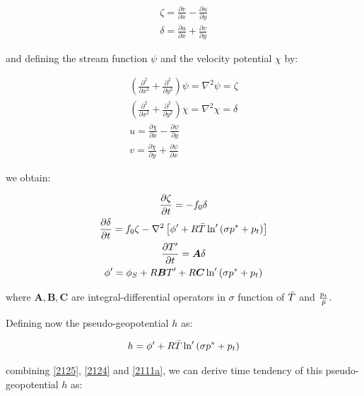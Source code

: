 \begin{gather}
  \label{vorticity}
  \zeta = \frac{\partial v}{\partial x} -
          \frac{\partial u}{\partial y} \\
  \label{divergence}
        \delta = \frac{\partial u}{\partial x} +
                 \frac{\partial v}{\partial y}
\end{gather}

and defining the stream function $\psi$ and the velocity potential $\chi$
by:

\begin{gather}
  \left(\frac{\partial^2}{\partial x^2} +
        \frac{\partial^2}{\partial y^2}\right) \psi = 
        \nabla^2 \psi = \zeta \\
  \left(\frac{\partial^2}{\partial x^2} +
        \frac{\partial^2}{\partial y^2}\right) \chi = 
        \nabla ^2 \chi = \delta \\
  u = \frac{\partial \chi}{\partial x} -
      \frac{\partial \psi}{\partial y} \\
  v = \frac{\partial \chi}{\partial y} +
      \frac{\partial \psi}{\partial x}
\end{gather}

we obtain:

\begin{gather}
  \frac{\partial \zeta}{\partial t} = -f_0 \delta \\
  \frac{\partial \delta}{\partial t} = f_0 \zeta -
    \nabla^2\left[\phi^{\prime} + R \bar{T}
    \ln^{\prime}\left(\sigma p^{\ast} + p_t\right)\right] \\
  \label{2124}
  \frac{\partial T^{\prime}}{\partial t} = \bm{A} \delta \\
  \label{2125}
  \phi^{\prime} = \phi_S + R \bm{B} T^{\prime} +
      R \bm{C} \ln^{\prime} \left(\sigma p^{\ast} + p_t\right)
\end{gather}

where $\bm{A}, \bm{B}, \bm{C}$ are integral-differential operators in $\sigma$
function of $\bar{T}$ and $\frac{p_t}{\bar{p}}$.

Defining now the pseudo-geopotential $h$ as:

\begin{gather}
  \label{pseudogeop}
  h = \phi^{\prime} + R \bar{T} \ln^{\prime}
      \left(\sigma p^{\ast} + p_t\right)
\end{gather}

combining \ref{2125}, \ref{2124} and \ref{2111a}, we can derive time tendency
of this pseudo-geopotential $h$ as:

